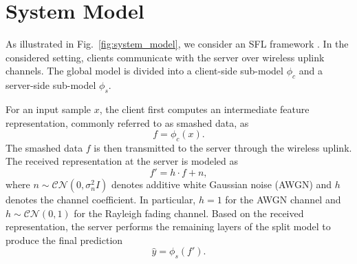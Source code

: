 %
%
%

%

\section{System Model}

As illustrated in Fig.~\ref{fig:system_model}, we consider an SFL framework \cite{gupta2018distributed,thapa2022splitfed}. In the considered setting, clients communicate with the server over wireless uplink channels. The global model is divided into a client-side sub-model $\phi_c$ and a server-side sub-model $\phi_s$.

For an input sample $x$, the client first computes an intermediate feature representation, commonly referred to as smashed data, as
\begin{equation}
    f = \phi_c(x).
\end{equation}
The smashed data $f$ is then transmitted to the server through the wireless uplink. The received representation at the server is modeled as
\begin{equation}
    f' = h \cdot f + n,
\end{equation}
where $n \sim \mathcal{CN}(0,\sigma_n^2 I)$ denotes additive white Gaussian noise (AWGN) and $h$ denotes the channel coefficient. In particular, $h=1$ for the AWGN channel and $h \sim \mathcal{CN}(0,1)$ for the Rayleigh fading channel. Based on the received representation, the server performs the remaining layers of the split model to produce the final prediction
\begin{equation}
    \hat{y} = \phi_s(f').
\end{equation}

